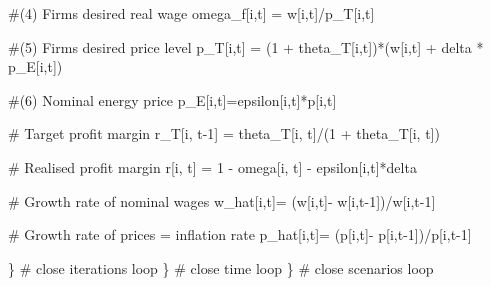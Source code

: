 \documentclass[
  letterpaper,
  DIV=11,
  numbers=noendperiod]{scrreprt}
\newenvironment{Shaded}{\begin{snugshade}}{\end{snugshade}}
\newcommand{\CommentTok}[1]{\textcolor[rgb]{0.37,0.37,0.37}{#1}}
\newcommand{\DecValTok}[1]{\textcolor[rgb]{0.68,0.00,0.00}{#1}}
\newcommand{\NormalTok}[1]{\textcolor[rgb]{0.00,0.23,0.31}{#1}}
\newcommand{\OtherTok}[1]{\textcolor[rgb]{0.00,0.23,0.31}{#1}}
\newcommand{\SpecialCharTok}[1]{\textcolor[rgb]{0.37,0.37,0.37}{#1}}
\begin{document}
\begin{Shaded}
\begin{Highlighting}[]
    \CommentTok{\#(4) Firms\textquotesingle{} desired real wage}
\NormalTok{    omega\_f[i,t] }\OtherTok{=}\NormalTok{ w[i,t]}\SpecialCharTok{/}\NormalTok{p\_T[i,t]}
    
    \CommentTok{\#(5) Firms\textquotesingle{} desired price level}
\NormalTok{    p\_T[i,t] }\OtherTok{=}\NormalTok{ (}\DecValTok{1} \SpecialCharTok{+}\NormalTok{ theta\_T[i,t])}\SpecialCharTok{*}\NormalTok{(w[i,t] }\SpecialCharTok{+}\NormalTok{ delta }\SpecialCharTok{*}\NormalTok{ p\_E[i,t])}
    
    \CommentTok{\#(6) Nominal energy price}
\NormalTok{    p\_E[i,t]}\OtherTok{=}\NormalTok{epsilon[i,t]}\SpecialCharTok{*}\NormalTok{p[i,t]}
    
    \CommentTok{\# Target profit margin}
\NormalTok{    r\_T[i, t}\DecValTok{{-}1}\NormalTok{] }\OtherTok{=}\NormalTok{ theta\_T[i, t]}\SpecialCharTok{/}\NormalTok{(}\DecValTok{1} \SpecialCharTok{+}\NormalTok{ theta\_T[i, t])}
    
    \CommentTok{\# Realised profit margin}
\NormalTok{    r[i, t] }\OtherTok{=} \DecValTok{1} \SpecialCharTok{{-}}\NormalTok{ omega[i, t] }\SpecialCharTok{{-}}\NormalTok{ epsilon[i,t]}\SpecialCharTok{*}\NormalTok{delta}
    
    \CommentTok{\# Growth rate of nominal wages}
\NormalTok{    w\_hat[i,t]}\OtherTok{=}\NormalTok{ (w[i,t]}\SpecialCharTok{{-}}\NormalTok{ w[i,t}\DecValTok{{-}1}\NormalTok{])}\SpecialCharTok{/}\NormalTok{w[i,t}\DecValTok{{-}1}\NormalTok{]}
    
    \CommentTok{\# Growth rate of prices = inflation rate}
\NormalTok{    p\_hat[i,t]}\OtherTok{=}\NormalTok{ (p[i,t]}\SpecialCharTok{{-}}\NormalTok{ p[i,t}\DecValTok{{-}1}\NormalTok{])}\SpecialCharTok{/}\NormalTok{p[i,t}\DecValTok{{-}1}\NormalTok{]}

\NormalTok{  \} }\CommentTok{\# close iterations loop}
\NormalTok{ \}  }\CommentTok{\# close time loop}
\NormalTok{\}   }\CommentTok{\# close scenarios loop}
\end{Highlighting}
\end{Shaded}
\end{document}
